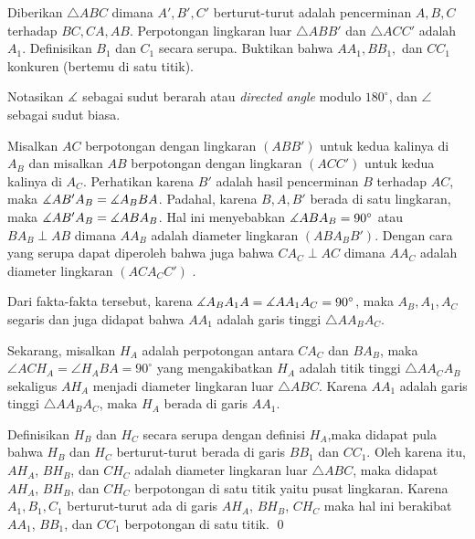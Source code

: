 \documentclass[11pt]{scrartcl}
\begin{document}
	\begin{soalbaru} 
		Diberikan $\triangle ABC$ dimana $A',B',C'$ berturut-turut adalah pencerminan $A,B,C$ terhadap $BC,CA,AB$. Perpotongan lingkaran luar $\triangle ABB'$ dan $\triangle ACC'$ adalah $A_1$. Definisikan $B_1$ dan $C_1$ secara serupa. Buktikan bahwa $AA_1,BB_1,$ dan $CC_1$ konkuren (bertemu di satu titik).\\[-10pt]
		
		\begin{solusi}
		Notasikan $\measuredangle$ sebagai sudut berarah atau \textit{ directed angle} modulo $180^\circ$, dan $\angle$ sebagai sudut biasa.
		
		Misalkan $AC$ berpotongan dengan lingkaran $(ABB')$ untuk kedua kalinya di $A_B$ dan misalkan $AB$ berpotongan dengan lingkaran $(ACC')$ untuk kedua kalinya di $A_C$. Perhatikan karena $B'$ adalah hasil pencerminan $B$ terhadap $AC$, maka $\measuredangle AB'A_B = \measuredangle A_BBA$. Padahal, karena $B,A,B'$ berada di satu lingkaran, maka $\measuredangle AB'A_B = \measuredangle ABA_B $. Hal ini menyebabkan $\measuredangle ABA_B = 90^\circ$ atau $BA_B \perp AB$ dimana $AA_B$ adalah diameter lingkaran $(ABA_BB')$. Dengan cara yang serupa dapat diperoleh bahwa juga bahwa $CA_C \perp AC$ dimana $AA_C$ adalah diameter lingkaran $(ACA_CC')$ .
		
		Dari fakta-fakta tersebut, karena $\measuredangle A_BA_1A = \measuredangle AA_1A_C = 90^\circ$, maka $A_B, A_1, A_C$ segaris dan juga didapat bahwa $AA_1$ adalah garis tinggi $\triangle AA_BA_C$.
		
		Sekarang, misalkan $H_A$ adalah perpotongan antara $CA_C$ dan $BA_B$, maka $\angle ACH_A = \angle H_ABA = 90^\circ$ yang mengakibatkan $H_A$ adalah titik tinggi $\triangle AA_CA_B$ sekaligus $AH_A$ menjadi diameter lingkaran luar $\triangle ABC$. Karena $AA_1$ adalah garis tinggi $\triangle AA_BA_C$, maka $H_A$ berada di garis $AA_1$.
		
		Definisikan $H_B$ dan $H_C$ secara serupa dengan definisi $H_A$,maka didapat pula bahwa $H_B$ dan $H_C$ berturut-turut berada di garis $BB_1$ dan $CC_1$. Oleh karena itu, $AH_A$, $BH_B$, dan $CH_C$ adalah diameter lingkaran luar $\triangle ABC$, maka didapat $AH_A$, $BH_B$, dan $CH_C$ berpotongan di satu titik yaitu pusat lingkaran. Karena $A_1,B_1,C_1$ berturut-turut ada di garis $AH_A$, $BH_B$, $CH_C$ maka hal ini berakibat $AA_1$, $BB_1$, dan $CC_1$ berpotongan di satu titik. \qed
		\end{solusi}
	\end{soalbaru}
	
\end{document}
